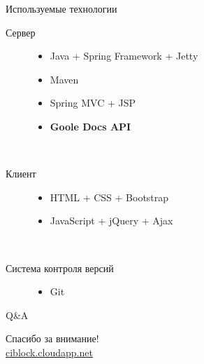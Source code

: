 \documentclass[14pt, fleqn, xcolor={dvipsnames, table}]{beamer}
\begin{document}
        \begin{frame}{Используемые технологии}
            \begin{description}
                \item [Сервер]
                    \begin{itemize}
                        \item Java + Spring Framework + Jetty
                        \item Maven
                        \item Spring MVC + JSP
                        \item \bf{Goole Docs API}
                    \end{itemize}
                ~\\
                \item [Клиент]
                    \begin{itemize}
                        \item HTML + CSS + Bootstrap
                        \item JavaScript + jQuery + Ajax
                    \end{itemize}
                ~\\
                \item [Система контроля версий]
                    \begin{itemize}
                        \item Git
                    \end{itemize}
            \end{description}
        \end{frame}
        
        \begin{frame}{Q\&A}
            \begin{center}
                Спасибо за внимание!\\
                \href{http://ciblock.cloudapp.net}{ciblock.cloudapp.net}
            \end{center}
        \end{frame}
\end{document}

